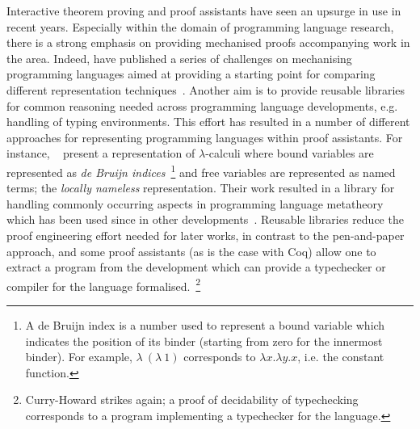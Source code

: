 \documentclass{mprop}
\begin{document}
Interactive theorem proving and proof assistants have seen an upsurge in use
in recent years. Especially within the domain of programming language
research, there is a strong emphasis on providing mechanised proofs
accompanying work in the area. Indeed, \citeauthor{Aydemir:2005:MMM} have
published a series of challenges on mechanising programming languages aimed at
providing a starting point for comparing different representation
techniques~\cite{Aydemir:2005:MMM}. Another aim is to provide reusable
libraries for common reasoning needed across programming language
developments, e.g. handling of typing environments. This effort has resulted
in a number of different approaches for representing programming languages
within proof assistants. For instance,
\citeauthor{Aydemir:2008:EFM}~\cite{Aydemir:2008:EFM} present a representation
of $\lambda$-calculi where bound variables are represented as \textit{de
  Bruijn indices}~\footnote{A de Bruijn index is a number used to represent a
  bound variable which indicates the position of its binder (starting from
  zero for the innermost binder). For example, $\lambda~(\lambda~1)$
  corresponds to $\lambda x. \lambda y. x$, i.e. the constant function.} and
free variables are represented as named terms; the \textit{locally nameless}
representation. Their work resulted in a library for handling commonly
occurring aspects in programming language metatheory which has been used since
in other developments~\cite{Park:2014:MMW}. Reusable libraries reduce the
proof engineering effort needed for later works, in contrast to the
pen-and-paper approach, and some proof assistants (as is the case with Coq)
allow one to extract a program from the development which can provide a
typechecker or compiler for the language formalised.~\footnote{Curry-Howard
  strikes again; a proof of decidability of typechecking corresponds to a
  program implementing a typechecker for the language.}
\end{document}
